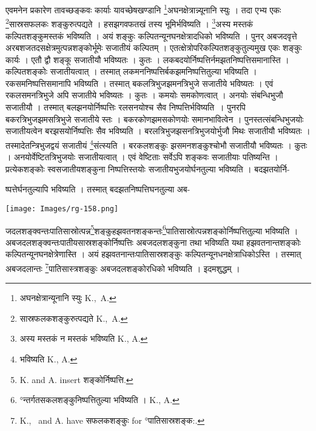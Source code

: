 \documentclass[11pt, openany]{book}
\begin{document}
 एवमनेन प्रकारेण तावच्छङ्कवः कार्याः यावच्छेषखण्डानि \renewcommand{\thefootnote}{२}\footnote{अघनक्षेत्रान्यूनानि स्युः {\en K.,~A.}}अघनक्षेत्रान्न्यूनानि स्युः । तदा एभ्य एकः \renewcommand{\thefootnote}{३}\footnote{सास्रफलकशङ्कुरुत्पद्यते {\en K.,~A.}}सास्रसफलकः शङ्कुरुत्पद्यते । हसझगवफतखं तस्य भूमिर्भविष्यति । \renewcommand{\thefootnote}{४}\footnote{अस्य मस्तकं न मस्तकं भविष्यति
 {\en K., A.}}अस्य मस्तकं कल्पितशङ्कुमस्तकं भविष्यति । अयं शङ्कुः कल्पितन्यूनघनक्षेत्रादधिको भविष्यति । पुनर् अबजदवृत्ते अरबशजतदसक्षेत्रमुत्पन्नशङ्कोर्भूमेः सजातीयं कल्पितम् । एतत्क्षेत्रोपरिकल्पितशङ्कुतुल्यमुख एकः शङ्कुः कार्यः । एतौ द्वौ शङ्कू सजातीयौ भविष्यतः । कुतः । लकबदयोर्निष्पत्तिर्नमझतनिष्पत्तिसमानास्ति । कल्पितशङ्कोः सजातीयत्वात् । तस्मात् लकमननिष्पत्तिर्बकझमनिष्पत्तितुल्या भविष्यति । रकसमनिष्पत्तिसमानापि भविष्यति । तस्मात् बकलत्रिभुजझमनत्रिभुजे सजातीये भविष्यतः । एवं रकलसमनत्रिभुजे अपि सजातीये भविष्यतः । कुतः । कमयोः समकोणत्वात् । अनयोः संबन्धिभुजौ सजातीयौ । तस्मात् बलझनयोर्निष्पत्तिः रलसनयोश्च सैव निष्पत्तिर्भविष्यति~। पुनरपि बकरत्रिभुजझमसत्रिभुजे सजातीये स्तः । बकरकोणझमसकोणयोः समानभावित्वेन । पुनस्तत्संबन्धिभुजयोः सजातीयत्वेन बरझसयोर्निष्पत्तिः सैव भविष्यति । बरलत्रिभुजझसनत्रिभुजयोर्भुजौ मिथः सजातीयौ भविष्यतः । तस्मादेतन्त्रिभुजद्वयं सजातीयं \renewcommand{\thefootnote}{५}\footnote{भविष्यति {\en K., A.}}संत्स्यति । बरकलशङ्कुः झसमनशङ्कुश्चोभौ सजातीयौ भविष्यतः ।
कुतः । अनयोर्वेष्टितत्रिभुजयोः सजातीयत्वात् । एवं वेष्टिताः सर्वेऽपि शङ्कवः सजातीयाः पतिष्यन्ति । प्रत्येकशङ्कोः स्वसजातीयशङ्कुना निष्पत्तिस्तयोः सजातीयभुजयोर्घनतुल्या भविष्यति । बदझतयोर्नि-

\newpage
\noindent ष्पत्तेर्घनतुल्यापि भविष्यति । तस्मात् बदझतनिष्पत्तिघनतुल्या
अब-
\begin{center}
\texttt{[image: Images/rg-158.png]}  
\end{center}
जदलशङ्क्वन्तःपातिसास्रोत्पन्न\renewcommand{\thefootnote}{१}\footnote{{\en K. and A. insert} शङ्कोर्निष्पत्ति. 
}शङ्कुहझवतनशङ्कन्तः\renewcommand{\thefootnote}{२}\footnote{°न्तर्गतसकलशङ्कुनिष्पत्तितुल्या भविष्यति । {\en K., A.}}पातिसास्रोत्पन्नशङ्कोर्निष्पत्तितुल्या भविष्यति । अबजदलशङ्क्वन्तःपातीयसास्रशङ्कोर्निष्पत्तिः अबजदलशङ्कुना तथा भविष्यति यथा हझवतनान्तशङ्कोः कल्पितन्यूनघनक्षेत्रेणास्ति । अयं हझवतनान्तःपातिसास्रशङ्कुः
कल्पितन्यूनधनक्षेत्राधिकोऽस्ति । तस्मात् अबजदलान्तः \renewcommand{\thefootnote}{३}\footnote{{\en K.,~ and A. have} सफलकशङ्कुः {\en for} °पातिसास्रशङ्क:. }पातिसास्त्रशङ्कुः अबजदलशङ्कोरधिको भविष्यति । इदमशुद्धम् । \\
\vspace{5mm}
\end{document}
